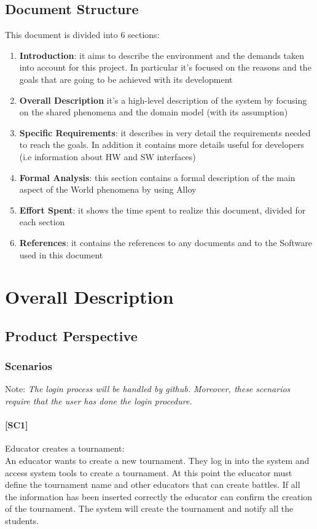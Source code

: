 \documentclass{article}
\begin{document}
\subsection{Document Structure}
This document is divided into 6 sections:\\
\begin{enumerate}
\item \textbf{Introduction}: it aims to describe the environment and the demands taken
into account for this project. In particular it’s focused on the reasons and the
goals that are going to be achieved with its development
\item \textbf{Overall Description} it’s a high-level description of the system by focusing on the shared phenomena and the domain model (with its assumption)
\item \textbf{Specific Requirements}: it describes in very detail the requirements needed
to reach the goals. In addition it contains more details useful for developers
(i.e information about HW and SW interfaces)
\item \textbf{Formal Analysis}: this section contains a formal description of the main
aspect of the World phenomena by using Alloy
\item \textbf{Effort Spent}: it shows the time spent to realize this document, divided for each section
\item \textbf{References}: it contains the references to any documents and to the Software
used in this document
\end{enumerate}

\newpage
\section{Overall Description}
\subsection{Product Perspective}
\subsubsection{Scenarios}
Note: \textit{ The login process will be handled by github. Moreover, these scenarios require that the user has done the login procedure.}

\paragraph{[SC1]}Educator creates a tournament:\\
An educator wants to create a new tournament. They log in into the system and access system tools to create a tournament. At this point the educator must define the tournament name and other educators that can create battles. If all the information has been inserted correctly the educator can confirm the creation of the tournament. The system will create the tournament and notify all the students.
\end{document}
